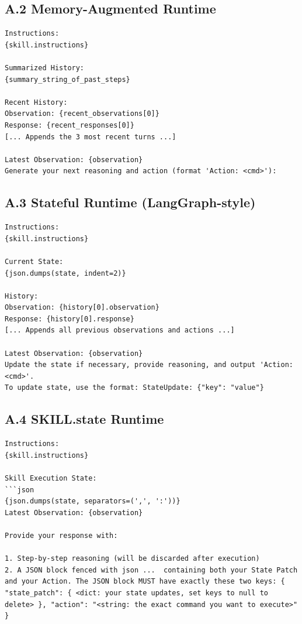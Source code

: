 \documentclass[11pt]{article}
\begin{document}
\subsection*{A.2 Memory-Augmented Runtime}
\begin{lstlisting}
Instructions:
{skill.instructions}

Summarized History:
{summary_string_of_past_steps}

Recent History:
Observation: {recent_observations[0]}
Response: {recent_responses[0]}
[... Appends the 3 most recent turns ...]

Latest Observation: {observation}
Generate your next reasoning and action (format 'Action: <cmd>'):
\end{lstlisting}

\subsection*{A.3 Stateful Runtime (LangGraph-style)}
\begin{lstlisting}
Instructions:
{skill.instructions}

Current State:
{json.dumps(state, indent=2)}

History:
Observation: {history[0].observation}
Response: {history[0].response}
[... Appends all previous observations and actions ...]

Latest Observation: {observation}
Update the state if necessary, provide reasoning, and output 'Action: <cmd>'.
To update state, use the format: StateUpdate: {"key": "value"}
\end{lstlisting}

\subsection*{A.4 SKILL.state Runtime}
\begin{lstlisting}
Instructions:
{skill.instructions}

Skill Execution State:
```json
{json.dumps(state, separators=(',', ':'))}
Latest Observation: {observation}

Provide your response with:

1. Step-by-step reasoning (will be discarded after execution)
2. A JSON block fenced with json ...  containing both your State Patch and your Action. The JSON block MUST have exactly these two keys: { "state_patch": { <dict: your state updates, set keys to null to delete> }, "action": "<string: the exact command you want to execute>" } \end{lstlisting}
\end{document}
